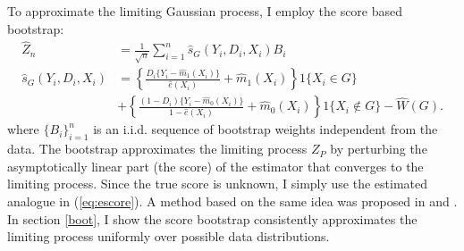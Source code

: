 \documentclass[12pt,oneside,reqno,english]{amsart}
\theoremstyle{definition}
\begin{document}
To approximate the limiting Gaussian process, I employ the score based bootstrap:
\begin{align}
\hat{Z}_{n}&=\frac{1}{\sqrt{n}}\sum_{i=1}^{n}\hat{s}_{G}(Y_{i},D_{i},X_{i})B_{i}\label{eq:boot}\\
\hat{s}_{G}(Y_{i},D_{i},X_{i})&=
\left\{\frac{D_{i}\{Y_{i}-\hat{m}_{1}(X_{i})\}}{\hat{e}(X_{i})}+\hat{m}_{1}(X_{i})\right\}1\{X_{i}\in G\}\nonumber\\
&  +\left\{\frac{(1-D_{i})\{Y_{i}-\hat{m}_{0}(X_{i})\}}{1-\hat{e}(X_{i})}+\hat{m}_{0}(X_{i}) \right\}1\{X_{i}\not\in G\}-\hat{W}(G).\label{eq:escore}
\end{align}
where $\{B_{i}\}_{i=1}^{n}$ is an i.i.d. sequence of bootstrap weights independent from the data. The bootstrap approximates the limiting process $Z_{P}$ by perturbing the asymptotically linear part (the score) of the estimator that converges to the limiting process. Since the true score is unknown, I simply use the estimated analogue in (\ref{eq:escore}). A method based on the same idea was proposed in \cite{KS:12} and \cite{BCFH:17}. In section \ref{boot}, I show the score bootstrap consistently approximates the limiting process uniformly over possible data distributions. 
\end{document}
